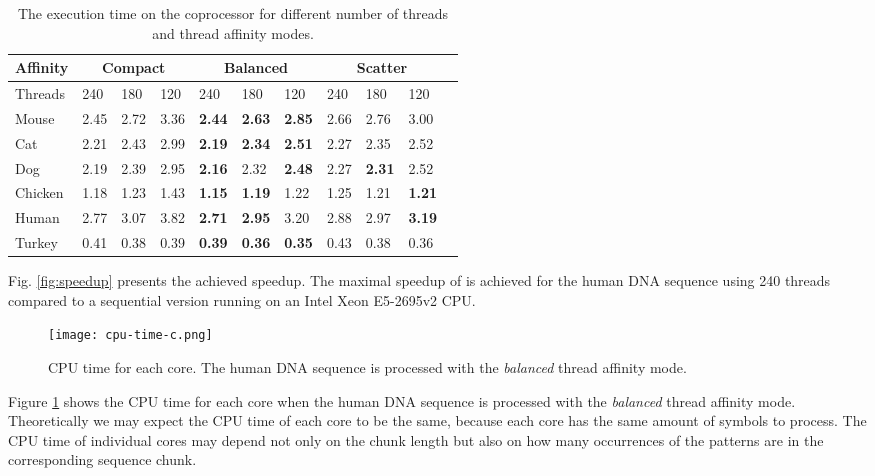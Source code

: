 \documentclass[conference]{IEEEtran}
\begin{document}
\begin{table}
	\caption{The execution time on the coprocessor for different number of threads and thread affinity modes.}
	\label{table:affinity}
	\centering
	\begin{tabular}{p{0.65cm}p{0.4cm}p{0.4cm}p{0.4cm}p{0.4cm}p{0.4cm}p{0.4cm}p{0.4cm}p{0.4cm}p{0.4cm}p{0.4cm}}
		\toprule
		Affinity & \multicolumn{3}{c}{Compact} & \multicolumn{3}{c}{Balanced} & \multicolumn{3}{c}{Scatter} \\ \midrule
		Threads & 240 & 180 & 120 & 240 & 180 & 120 & 240 & 180 & 120 \\ \midrule
		Mouse & 2.45 & 2.72 & 3.36 & \textbf{2.44} & \textbf{2.63} & \textbf{2.85} & 2.66 & 2.76 & 3.00 \\
		Cat & 2.21 & 2.43 & 2.99 & \textbf{2.19} & \textbf{2.34} & \textbf{2.51} & 2.27 & 2.35 & 2.52 \\
		Dog & 2.19 & 2.39 & 2.95 & \textbf{2.16} & 2.32 & \textbf{2.48} & 2.27 & \textbf{2.31} & 2.52 \\
		Chicken & 1.18 & 1.23 & 1.43 & \textbf{1.15} & \textbf{1.19} & 1.22 & 1.25 & 1.21 & \textbf{1.21} \\
		Human & 2.77 & 3.07 & 3.82 & \textbf{2.71} & \textbf{2.95} & 3.20 & 2.88 & 2.97 & \textbf{3.19} \\
		Turkey & 0.41 & 0.38 & 0.39 & \textbf{0.39} & \textbf{0.36} & \textbf{0.35} & 0.43 & 0.38 & 0.36 \\ \bottomrule
	\end{tabular}
\end{table}

Fig. \ref{fig:speedup} presents the achieved speedup. The maximal speedup of  is achieved for the human DNA sequence using 240 threads compared to a sequential version running on an Intel Xeon E5-2695v2 CPU.

\begin{figure}[!t]
	\centering
	\texttt{[image: cpu-time-c.png]}
	\caption{CPU time for each core. The human DNA sequence is processed with the \emph{balanced} thread affinity mode.}
	\label{fig:core-allocation}
\end{figure} 

Figure \ref{fig:core-allocation} shows the CPU time for each core when the human DNA sequence is processed with the \emph{balanced} thread affinity mode. Theoretically we may expect the CPU time of each core to be the same, because each core has the same amount of symbols to process. The CPU time of individual cores may depend not only on the chunk length but also on how many occurrences of the patterns are in the corresponding sequence chunk.
\end{document}
